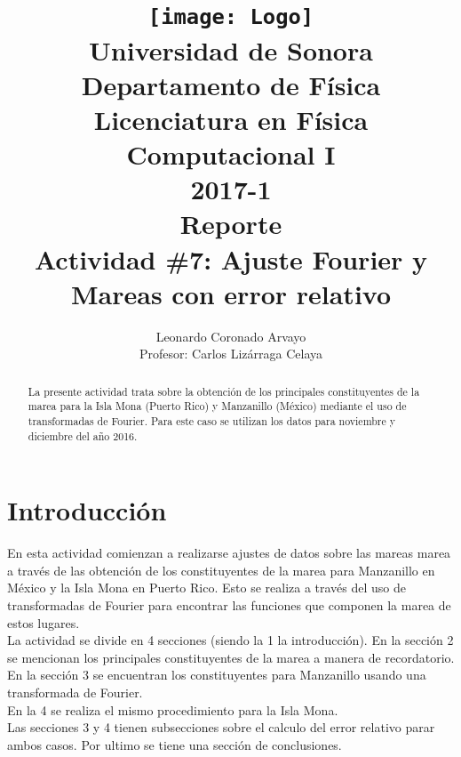 \documentclass[12pt,letterpaper]{article}
\author{
Leonardo Coronado Arvayo\\
Profesor: Carlos Lizárraga Celaya   \vspace*{1.25in}}
\title{	\texttt{[image: Logo]} \\
Universidad de Sonora \\
{\small Departamento de Física \\
Licenciatura en Física \\
Computacional I \\
2017-1 \\
\vspace{0.55in} Reporte}\\ 
{\Huge Actividad \#7: Ajuste Fourier y Mareas con error relativo}\\
\vspace*{1.0in}}
\begin{document}
	\maketitle
\newpage
	\tableofcontents
\pagebreak

\begin{abstract}


La presente actividad trata sobre la obtención de los principales constituyentes de la marea para la Isla Mona (Puerto Rico) y Manzanillo (México) mediante el uso de transformadas de Fourier. Para este caso se utilizan los datos para noviembre y diciembre del año 2016.


\end{abstract}


\section{Introducción}

En esta actividad comienzan a realizarse ajustes de datos sobre las mareas marea a través de las obtención de los constituyentes de la marea para Manzanillo en México y la Isla Mona en Puerto Rico. 
Esto se realiza a través del uso de transformadas de Fourier para encontrar las funciones que componen la marea de estos lugares.\\


La actividad se divide en 4 secciones (siendo la 1 la introducción). En la sección 2 se mencionan los principales constituyentes de la marea a manera de recordatorio.\\
En la sección 3 se encuentran los constituyentes para Manzanillo usando una transformada de Fourier. \\
En la 4 se realiza el mismo procedimiento para la Isla Mona.\\
Las secciones 3 y 4 tienen subsecciones sobre el calculo del error relativo parar ambos casos.
Por ultimo se tiene una sección de conclusiones.\\
\end{document}
